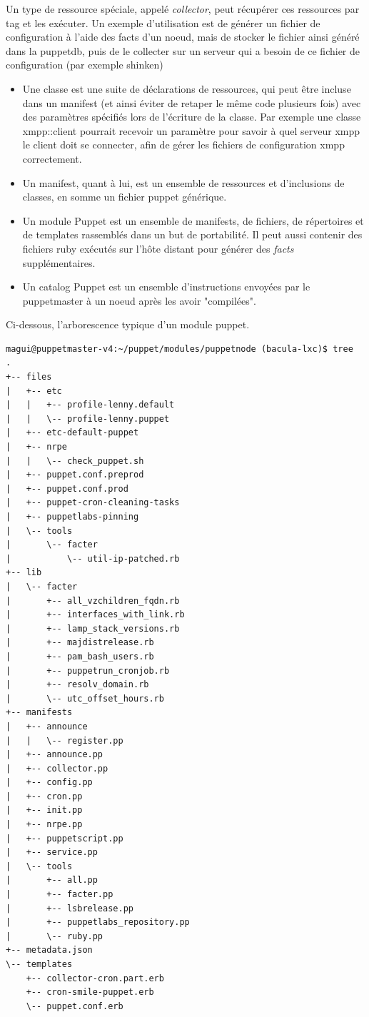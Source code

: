 \documentclass[14 pt,a4paper]{extreport}
\begin{document}
Un type de ressource spéciale, appelé \emph{collector}, peut récupérer ces ressources par tag et les exécuter. Un exemple d'utilisation est de générer un fichier de configuration à l'aide des facts d'un noeud, mais de stocker le fichier ainsi généré dans la puppetdb, puis de le collecter sur un serveur qui a besoin de ce fichier de configuration (par exemple shinken)

\begin{itemize}
	\item Une classe est une suite de déclarations de ressources, qui peut être incluse dans un manifest (et ainsi éviter de retaper le même code plusieurs fois) avec des paramètres spécifiés lors de l'écriture de la classe. Par exemple une classe xmpp::client pourrait recevoir un paramètre pour savoir à quel serveur xmpp le client doit se connecter, afin de gérer les fichiers de configuration xmpp correctement.
	\item Un manifest, quant à lui, est un ensemble de ressources et d'inclusions de classes, en somme un fichier puppet générique.
	\item Un module Puppet est un ensemble de manifests, de fichiers, de répertoires et de templates rassemblés dans un but de portabilité. Il peut aussi contenir des fichiers ruby exécutés sur l'hôte distant pour générer des \emph{facts} supplémentaires.
	\item Un catalog Puppet est un ensemble d'instructions envoyées par le puppetmaster à un noeud après les avoir "compilées".
\end{itemize}

Ci-dessous, l'arborescence typique d'un module puppet.

\begin{Verbatim}[fontsize=\scriptsize]
magui@puppetmaster-v4:~/puppet/modules/puppetnode (bacula-lxc)$ tree
.
+-- files
|   +-- etc
|   |   +-- profile-lenny.default
|   |   \-- profile-lenny.puppet
|   +-- etc-default-puppet
|   +-- nrpe
|   |   \-- check_puppet.sh
|   +-- puppet.conf.preprod
|   +-- puppet.conf.prod
|   +-- puppet-cron-cleaning-tasks
|   +-- puppetlabs-pinning
|   \-- tools
|       \-- facter
|           \-- util-ip-patched.rb
+-- lib
|   \-- facter
|       +-- all_vzchildren_fqdn.rb
|       +-- interfaces_with_link.rb
|       +-- lamp_stack_versions.rb
|       +-- majdistrelease.rb
|       +-- pam_bash_users.rb
|       +-- puppetrun_cronjob.rb
|       +-- resolv_domain.rb
|       \-- utc_offset_hours.rb
+-- manifests
|   +-- announce
|   |   \-- register.pp
|   +-- announce.pp
|   +-- collector.pp
|   +-- config.pp
|   +-- cron.pp
|   +-- init.pp
|   +-- nrpe.pp
|   +-- puppetscript.pp
|   +-- service.pp
|   \-- tools
|       +-- all.pp
|       +-- facter.pp
|       +-- lsbrelease.pp
|       +-- puppetlabs_repository.pp
|       \-- ruby.pp
+-- metadata.json
\-- templates
    +-- collector-cron.part.erb
    +-- cron-smile-puppet.erb
    \-- puppet.conf.erb

\end{Verbatim}
\end{document}
